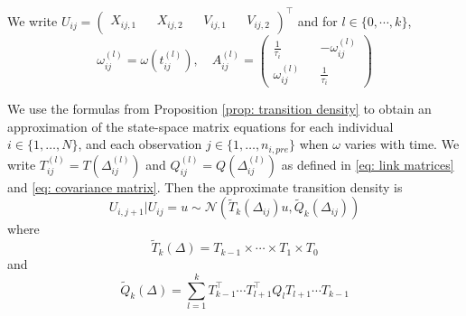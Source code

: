 \documentclass[aoas]{imsart}
\theoremstyle{definition}
\theoremstyle{remark}
\theoremstyle{remark}
\newcommand {\1}{\mathbb{1}}
\begin{document}
We write $U_{ij}=\begin{pmatrix} X_{ij,1}  && X_{ij,2} && V_{ij,1} && V_{ij,2}\end{pmatrix}^\top$ and for $l \in \{0,\cdots,k\}$,
\[\omega_{ij}^{(l)}=\omega(t_{ij}^{(l)}), \quad   A_{ij}^{(l)}=\begin{pmatrix} 
	\frac{1}{\tau_{i}} && -\omega_{ij}^{(l)} \\
	\omega_{ij}^{(l)} && \frac{1}{\tau_{i}}
\end{pmatrix} \]


We use the formulas from Proposition \ref{prop: transition density} to obtain an approximation of the state-space matrix equations for each individual $i\in\{1,\ldots, N\}$, and each observation $j\in\{1, \ldots, n_{i,pre}\}$ when $\omega$ varies with time. We write $T_{ij}^{(l)}=T(\Delta_{ij}^{(l)})$ and $Q_{ij}^{(l)}=Q(\Delta_{ij}^{(l)})$ as defined in \eqref{eq: link matrices} and \eqref{eq: covariance matrix}.
Then the approximate transition density is 
	\begin{equation}
	U_{i,j+1} \vert U_{ij}=u \sim \mathcal{N}\left( \tilde{T}_k(\Delta_{ij}) u, \tilde{Q}_k(\Delta_{ij})\right)
	\label{eq: approximate transition density}
\end{equation}
where 
    \begin{equation}
    \tilde{T}_k(\Delta) = T_{k-1} \times \cdots \times T_1 \times T_0 
    \end{equation}
and 
    \begin{equation}
        \tilde{Q}_k(\Delta) =\sum_{l=1}^{k} T_{k-1}^\top \cdots T_{l+1}^\top Q_l T_{l+1} \cdots T_{k-1}
    \end{equation}
\end{document}

